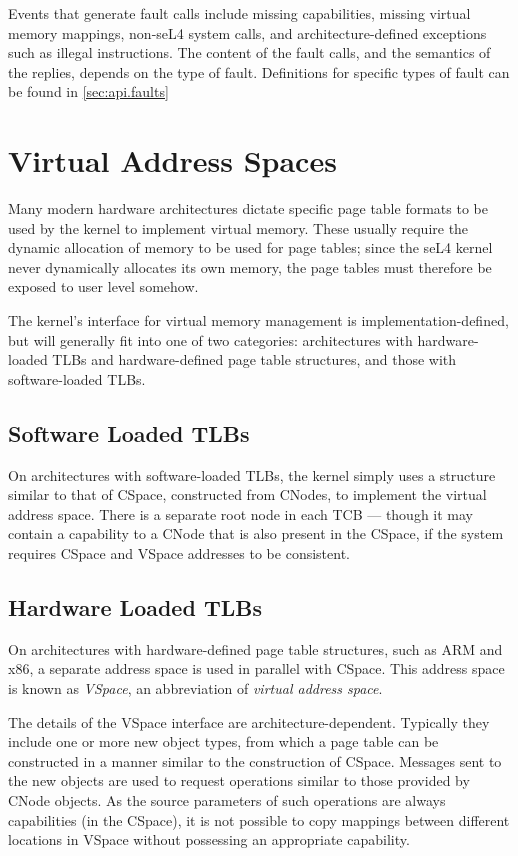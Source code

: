 Events that generate fault calls include missing capabilities, missing virtual memory mappings, non-seL4 system calls, and architecture-defined exceptions such as illegal instructions. The content of the fault calls, and the semantics of the replies, depends on the type of fault. Definitions for specific types of fault can be found in \autoref{sec:api.faults}

\section{Virtual Address Spaces}\label{sec:overview.vm}

Many modern hardware architectures dictate specific page table formats to be
used by the kernel to implement virtual memory. These usually require the
dynamic allocation of memory to be used for page tables; since the seL4 kernel
never dynamically allocates its own memory, the page tables must therefore be
exposed to user level somehow.

The kernel's interface for virtual memory management is
implementation-defined, but will generally fit into one of two categories:
architectures with hardware-loaded TLBs and hardware-defined page table
structures, and those with software-loaded TLBs.

\subsection{Software Loaded TLBs}

On architectures with software-loaded TLBs, the kernel simply uses a structure
similar to that of CSpace, constructed from CNodes, to implement the virtual
address space. There is a separate root node in each TCB --- though it may
contain a capability to a CNode that is also present in the CSpace, if the
system requires CSpace and VSpace addresses to be consistent.

\subsection{Hardware Loaded TLBs}

On architectures with hardware-defined page table structures, such as ARM and
x86, a separate address space is used in parallel with CSpace. This address
space is known as \emph{VSpace}, an abbreviation of \emph{virtual address
space}.

The details of the VSpace interface are architecture-dependent. Typically they
include one or more new object types, from which a page table can be
constructed in a manner similar to the construction of CSpace. Messages sent
to the new objects are used to request operations similar to those provided by
CNode objects. As the source parameters of such operations are always
capabilities (in the CSpace), it is not possible to copy mappings between
different locations in VSpace without possessing an appropriate capability.

